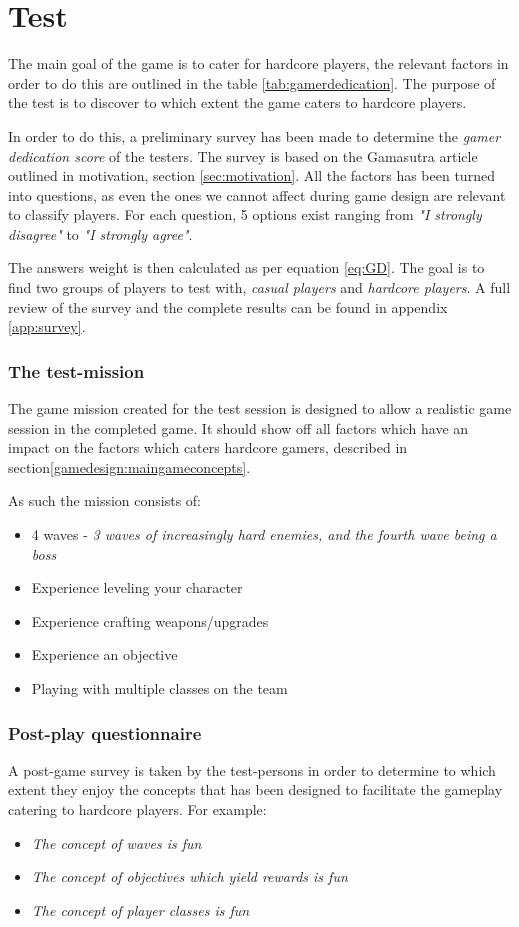 \chapter{Test}
The main goal of the game is to cater for hardcore players, the relevant factors in order to do this are outlined in the table \ref{tab:gamerdedication}.
The purpose of the test is to discover to which extent the game caters to hardcore players.

In order to do this, a preliminary survey has been made to determine the \emph{gamer dedication score} of the testers.
The survey is based on the Gamasutra article\cite{casual_vs_hardcore} outlined in motivation, section \ref{sec:motivation}.
All the factors has been turned into questions, as even the ones we cannot affect during game design are relevant to classify players.
For each question, 5 options exist ranging from \textit{"I strongly disagree"} to \textit{"I strongly agree"}.

The answers weight is then calculated as per equation \ref{eq:GD}.
The goal is to find two groups of players to test with, \emph{casual players} and \emph{hardcore players}.
A full review of the survey and the complete results can be found in appendix \ref{app:survey}.

\subsection*{The test-mission}
The game mission created for the test session is designed to allow a realistic game session in the completed game.
It should show off all factors which have an impact on the factors which caters hardcore gamers, described in section\ref{gamedesign:maingameconcepts}.

As such the mission consists of:

\begin{itemize}
\item 4 waves - \emph{3 waves of increasingly hard enemies, and the fourth wave being a boss}
\item Experience leveling your character
\item Experience crafting weapons/upgrades
\item Experience an objective
\item Playing with multiple classes on the team
\end{itemize}

\subsection*{Post-play questionnaire}
A post-game survey is taken by the test-persons in order to determine to which extent they enjoy the concepts that has been designed to facilitate the gameplay catering to hardcore players.
For example:
\begin{itemize}
\item \emph{The concept of waves is fun}
\item \emph{The concept of objectives which yield rewards is fun}
\item \emph{The concept of player classes is fun}
\end{itemize}

